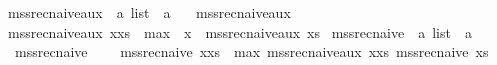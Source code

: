\begin{isabellebody}
\endisatagproof
{\isafoldproof}%
%
\isadelimproof
%
\endisadelimproof
%
\isadelimdocument
%
\endisadelimdocument
%
\isatagdocument
%
\isamarkuptrue%
%
\endisatagdocument
{\isafolddocument}%
%
\isadelimdocument
%
\endisadelimdocument
{}\isamarkupfalse%
\ mss{\isacharunderscore}{\kern0pt}rec{\isacharunderscore}{\kern0pt}naive{\isacharunderscore}{\kern0pt}aux\ {\isacharcolon}{\kern0pt}{\isacharcolon}{\kern0pt}\ {\isachardoublequoteopen}{\isacharprime}{\kern0pt}a\ list\ {\isasymRightarrow}\ {\isacharprime}{\kern0pt}a{\isachardoublequoteclose}\ \isanewline
\ \ {\isachardoublequoteopen}mss{\isacharunderscore}{\kern0pt}rec{\isacharunderscore}{\kern0pt}naive{\isacharunderscore}{\kern0pt}aux\ {\isacharbrackleft}{\kern0pt}{\isacharbrackright}{\kern0pt}\ {\isacharequal}{\kern0pt}\ {}{\isachardoublequoteclose}\isanewline
{\isacharbar}{\kern0pt}\ {\isachardoublequoteopen}mss{\isacharunderscore}{\kern0pt}rec{\isacharunderscore}{\kern0pt}naive{\isacharunderscore}{\kern0pt}aux\ {\isacharparenleft}{\kern0pt}x{\isacharhash}{\kern0pt}xs{\isacharparenright}{\kern0pt}\ {\isacharequal}{\kern0pt}\ max\ {}\ {\isacharparenleft}{\kern0pt}x\ {\isacharplus}{\kern0pt}\ mss{\isacharunderscore}{\kern0pt}rec{\isacharunderscore}{\kern0pt}naive{\isacharunderscore}{\kern0pt}aux\ xs{\isacharparenright}{\kern0pt}{\isachardoublequoteclose}\isanewline
\isanewline
{}\isamarkupfalse%
\ mss{\isacharunderscore}{\kern0pt}rec{\isacharunderscore}{\kern0pt}naive\ {\isacharcolon}{\kern0pt}{\isacharcolon}{\kern0pt}\ {\isachardoublequoteopen}{\isacharprime}{\kern0pt}a\ list\ {\isasymRightarrow}\ {\isacharprime}{\kern0pt}a{\isachardoublequoteclose}\ \isanewline
\ \ {\isachardoublequoteopen}mss{\isacharunderscore}{\kern0pt}rec{\isacharunderscore}{\kern0pt}naive\ {\isacharbrackleft}{\kern0pt}{\isacharbrackright}{\kern0pt}\ {\isacharequal}{\kern0pt}\ {}{\isachardoublequoteclose}\isanewline
{\isacharbar}{\kern0pt}\ {\isachardoublequoteopen}mss{\isacharunderscore}{\kern0pt}rec{\isacharunderscore}{\kern0pt}naive\ {\isacharparenleft}{\kern0pt}x{\isacharhash}{\kern0pt}xs{\isacharparenright}{\kern0pt}\ {\isacharequal}{\kern0pt}\ max\ {\isacharparenleft}{\kern0pt}mss{\isacharunderscore}{\kern0pt}rec{\isacharunderscore}{\kern0pt}naive{\isacharunderscore}{\kern0pt}aux\ {\isacharparenleft}{\kern0pt}x{\isacharhash}{\kern0pt}xs{\isacharparenright}{\kern0pt}{\isacharparenright}{\kern0pt}\ {\isacharparenleft}{\kern0pt}mss{\isacharunderscore}{\kern0pt}rec{\isacharunderscore}{\kern0pt}naive\ xs{\isacharparenright}{\kern0pt}{\isachardoublequoteclose}\isanewline

\end{isabellebody}
